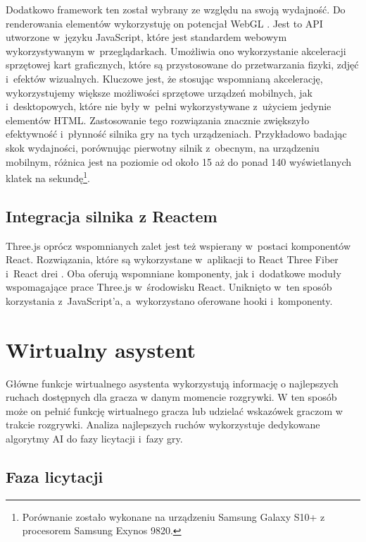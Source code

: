 Dodatkowo framework ten został wybrany ze względu na swoją wydajność.
Do renderowania elementów wykorzystuję on potencjał WebGL \cite{WebGL}.
Jest to API utworzone
w~języku JavaScript, które jest standardem webowym wykorzystywanym
w~przeglądarkach. Umożliwia ono wykorzystanie akceleracji sprzętowej kart
graficznych, które są przystosowane do przetwarzania fizyki, zdjęć
i~efektów wizualnych. Kluczowe jest, że stosując wspomnianą akcelerację,
wykorzystujemy większe możliwości sprzętowe urządzeń mobilnych, jak
i~desktopowych, które nie były w~pełni wykorzystywane z~użyciem
jedynie elementów HTML.
Zastosowanie tego rozwiązania
znacznie zwiększyło efektywność i~płynność silnika gry na tych urządzeniach.
Przykładowo badając skok wydajności, porównując pierwotny silnik z~obecnym,
na urządzeniu mobilnym, różnica jest na poziomie od około 15 aż do
ponad 140 wyświetlanych
klatek na sekundę\footnote{
  Porównanie zostało wykonane na urządzeniu
  Samsung Galaxy S10+ z procesorem Samsung Exynos 9820.
}.

\FloatBarrier

\subsection{Integracja silnika z Reactem}
Three.js oprócz wspomnianych zalet jest też wspierany w~postaci komponentów React.
Rozwiązania, które są wykorzystane w~aplikacji to React Three Fiber
\cite{ReactThreeFiber} i~React drei \cite{ReactDrei}. Oba oferują
wspomniane komponenty, jak i~dodatkowe moduły
wspomagające prace Three.js w~środowisku React. Uniknięto w~ten sposób korzystania
z~JavaScript'a, a~wykorzystano oferowane hooki i~komponenty.



\section{Wirtualny asystent}

Główne funkcje wirtualnego asystenta wykorzystują informację o najlepszych ruchach
dostępnych dla gracza w danym momencie rozgrywki.
W ten sposób może on pełnić funkcję wirtualnego gracza lub
udzielać wskazówek graczom w trakcie rozgrywki.
Analiza najlepszych ruchów wykorzystuje dedykowane algorytmy AI
do fazy licytacji i~fazy gry.

\subsection{Faza licytacji}

